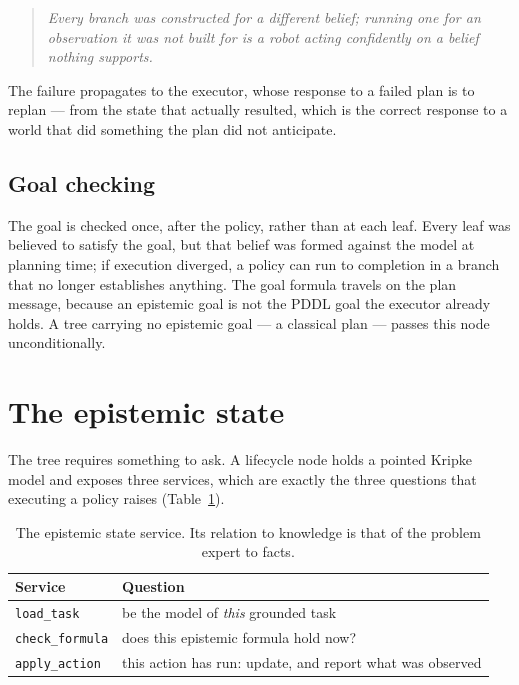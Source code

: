 \documentclass[11pt,a4paper]{article}
\theoremstyle{definition}
\newcommand{\code}[1]{\texttt{\small #1}}
\begin{document}
\begin{quote}\itshape\color{slate}
Every branch was constructed for a different belief; running one for an
observation it was not built for is a robot acting confidently on a belief
nothing supports.
\end{quote}

\noindent The failure propagates to the executor, whose response to a failed plan
is to replan --- from the state that actually resulted, which is the correct
response to a world that did something the plan did not anticipate.

\subsection{Goal checking}

The goal is checked once, after the policy, rather than at each leaf. Every leaf
was believed to satisfy the goal, but that belief was formed against the model at
planning time; if execution diverged, a policy can run to completion in a branch
that no longer establishes anything. The goal formula travels on the plan
message, because an epistemic goal is not the PDDL goal the executor already
holds. A tree carrying no epistemic goal --- a classical plan --- passes this
node unconditionally.

\section{The epistemic state}
\label{sec:state}

The tree requires something to ask. A lifecycle node holds a pointed Kripke model
and exposes three services, which are exactly the three questions that executing
a policy raises (Table~\ref{tab:services}).

\begin{table}[H]
\centering
\small
\begin{tabularx}{\textwidth}{@{}lX@{}}
\toprule
\textbf{Service} & \textbf{Question} \\
\midrule
\code{load\_task}     & be the model of \emph{this} grounded task \\
\code{check\_formula} & does this epistemic formula hold now? \\
\code{apply\_action}  & this action has run: update, and report what was observed \\
\bottomrule
\end{tabularx}
\caption{The epistemic state service. Its relation to knowledge is that of the
problem expert to facts.}
\label{tab:services}
\end{table}
\end{document}
